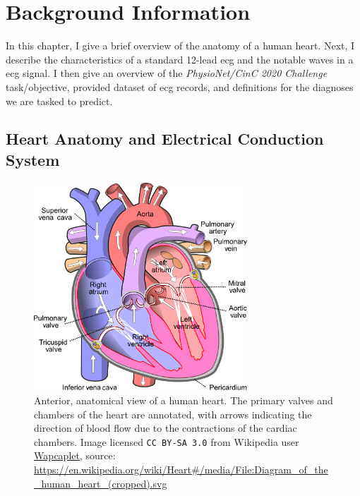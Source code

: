 \documentclass[\main/thesis.tex]{subfiles}
\begin{document}
\chapter{Background Information}
\label{chp:background}

In this chapter, I give a brief overview of the anatomy of a human heart.
Next, I describe the characteristics of a standard 12-lead \gls{ecg} and the notable waves in a \gls{ecg} signal.
I then give an overview of the \emph{PhysioNet/CinC 2020 Challenge} task/objective, provided dataset of \gls{ecg} records, and definitions for the diagnoses we are tasked to predict.

\section{Heart Anatomy and Electrical Conduction System}

\begin{figure}[ht]
    \centering
    \includegraphics[width=8cm]{figure/Diagram_of_the_human_heart.pdf}
    \caption[Anterior, anatomical view of the structures of a human heart.]{Anterior, anatomical view of a human heart. The primary valves and chambers of the heart are annotated, with arrows indicating the direction of blood flow due to the contractions of the cardiac chambers.
    Image licensed \texttt{CC BY-SA 3.0} from Wikipedia user \href{https://en.wikipedia.org/wiki/User:Wapcaplet}{Wapcaplet}, source: \url{https://en.wikipedia.org/wiki/Heart\#/media/File:Diagram\_of\_the\_human\_heart\_(cropped).svg}
    }
    \label{fig:heart_anatomy}
\end{figure}
\end{document}
